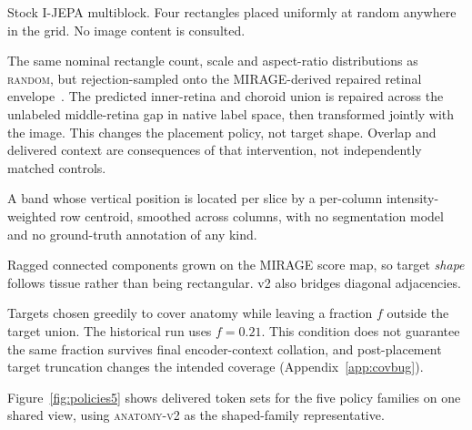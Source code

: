 \documentclass{article}
\newcommand{\ArmBest}{\textsc{centroid}}
\begin{document}
\begin{description}
\setlength{\itemsep}{1pt}\setlength{\parskip}{0pt}
\item[\textsc{random} (null).] Stock I-JEPA multiblock. Four rectangles placed
  uniformly at random anywhere in the grid. No image content is consulted.

\item[\textsc{envelope} (random-within-retina).] The same nominal rectangle
count, scale and aspect-ratio distributions as \textsc{random}, but
rejection-sampled onto the MIRAGE-derived repaired retinal
envelope~\citep{morano2025mirage}. The predicted inner-retina and choroid union
is repaired across the unlabeled middle-retina gap in native label space,
then transformed jointly with the image. This
  changes the placement policy, not target shape. Overlap and delivered context
  are consequences of that intervention, not independently matched controls.

\item[\ArmBest{} (segmentation-free).] A band whose vertical position is
  located per slice by a per-column intensity-weighted row centroid, smoothed
  across columns, with no segmentation model and no ground-truth
  annotation of any kind.

\item[\textsc{anatomy-v1} / \textsc{anatomy-v2}.] Ragged connected components
  grown on the MIRAGE score map, so target \emph{shape} follows tissue rather
  than being rectangular. v2 also bridges diagonal adjacencies.

\item[\textsc{cover} $f$.] Targets chosen greedily to cover anatomy while
  leaving a fraction $f$ outside the target union. The historical run uses
  $f{=}0.21$. This condition does not guarantee the same fraction survives
  final encoder-context collation, and post-placement target truncation changes
  the intended coverage (Appendix~\ref{app:covbug}).
\end{description}

Figure~\ref{fig:policies5} shows delivered token sets for the five policy
families on one shared view, using \textsc{anatomy-v2} as the shaped-family
representative.
\end{document}
